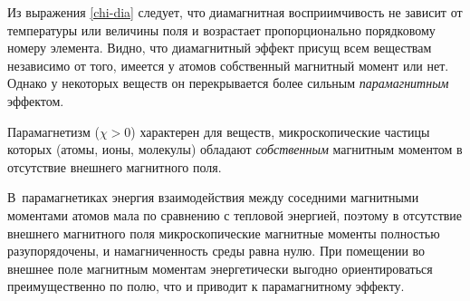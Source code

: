 %
%
%


Из выражения \eqref{chi-dia} следует, что диамагнитная восприимчивость 
не зависит от температуры или величины поля
и возрастает пропорционально порядковому номеру элемента.
Видно, что диамагнитный эффект присущ всем веществам независимо от того, 
имеется у атомов собственный магнитный момент или нет. Однако у некоторых 
веществ он перекрывается более сильным \emph{парамагнитным} эффектом.


\label{sec:paramagnetism}

Парамагнетизм ($\chi>0$) характерен для веществ, микроскопические частицы которых 
(атомы, ионы, молекулы) обладают \emph{собственным} магнитным 
моментом в отсутствие внешнего магнитного поля.

В~парамагнетиках энергия взаимодействия между соседними магнитными моментами
атомов мала по сравнению с тепловой энергией,
поэтому в отсутствие внешнего магнитного поля микроскопические магнитные моменты
полностью разупорядочены, и намагниченность среды равна нулю.
При помещении во внешнее поле магнитным моментам энергетически выгодно
ориентироваться преимущественно по полю, что и приводит к парамагнитному эффекту.

